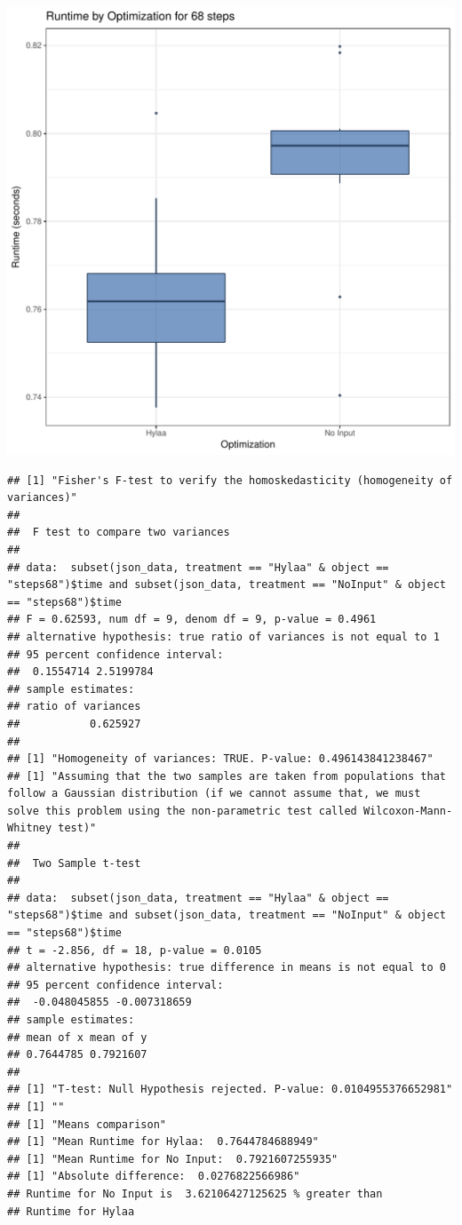 \documentclass{article}\usepackage[]{graphicx}\usepackage[]{color}
\makeatletter
\def\maxwidth{ %
  \ifdim\Gin@nat@width>\linewidth
    \linewidth
  \else
    \Gin@nat@width
  \fi
}
\newenvironment{kframe}{%
 \def\at@end@of@kframe{}%
 \ifinner\ifhmode%
  \def\at@end@of@kframe{\end{minipage}}%
  \begin{minipage}{\columnwidth}%
 \fi\fi%
 \def\FrameCommand##1{\hskip\@totalleftmargin \hskip-\fboxsep
 \colorbox{shadecolor}{##1}\hskip-\fboxsep
     \hskip-\linewidth \hskip-\@totalleftmargin \hskip\columnwidth}%
 \MakeFramed {\advance\hsize-\width
   \@totalleftmargin\z@ \linewidth\hsize
   \@setminipage}}%
 {\par\unskip\endMakeFramed%
 \at@end@of@kframe}
\newenvironment{knitrout}{}{} %
\makeatother
\begin{document}
\begin{knitrout}
\color{fgcolor}
\includegraphics[width=\maxwidth]{figure/RH4_steps68-1} 
\begin{kframe}\begin{verbatim}
## [1] "Fisher's F-test to verify the homoskedasticity (homogeneity of variances)"
## 
## 	F test to compare two variances
## 
## data:  subset(json_data, treatment == "Hylaa" & object == "steps68")$time and subset(json_data, treatment == "NoInput" & object == "steps68")$time
## F = 0.62593, num df = 9, denom df = 9, p-value = 0.4961
## alternative hypothesis: true ratio of variances is not equal to 1
## 95 percent confidence interval:
##  0.1554714 2.5199784
## sample estimates:
## ratio of variances 
##           0.625927 
## 
## [1] "Homogeneity of variances: TRUE. P-value: 0.496143841238467"
## [1] "Assuming that the two samples are taken from populations that follow a Gaussian distribution (if we cannot assume that, we must solve this problem using the non-parametric test called Wilcoxon-Mann-Whitney test)"
## 
## 	Two Sample t-test
## 
## data:  subset(json_data, treatment == "Hylaa" & object == "steps68")$time and subset(json_data, treatment == "NoInput" & object == "steps68")$time
## t = -2.856, df = 18, p-value = 0.0105
## alternative hypothesis: true difference in means is not equal to 0
## 95 percent confidence interval:
##  -0.048045855 -0.007318659
## sample estimates:
## mean of x mean of y 
## 0.7644785 0.7921607 
## 
## [1] "T-test: Null Hypothesis rejected. P-value: 0.0104955376652981"
## [1] ""
## [1] "Means comparison"
## [1] "Mean Runtime for Hylaa:  0.7644784688949"
## [1] "Mean Runtime for No Input:  0.7921607255935"
## [1] "Absolute difference:  0.0276822566986"
## Runtime for No Input is  3.62106427125625 % greater than 
## Runtime for Hylaa
\end{verbatim}
\end{kframe}
\end{knitrout}
\end{document}
